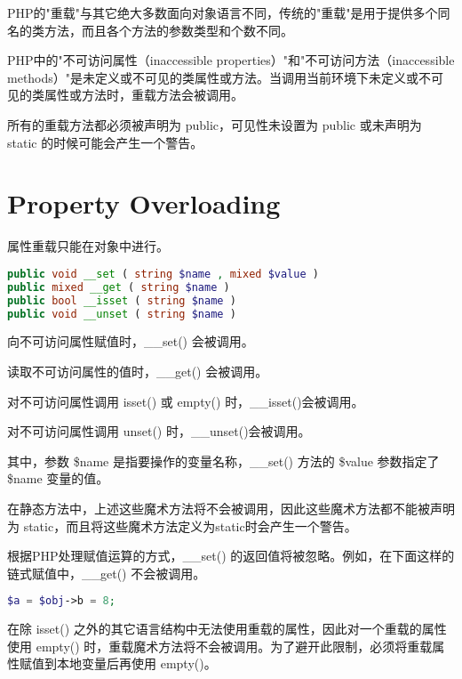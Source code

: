PHP的"重载"与其它绝大多数面向对象语言不同，传统的"重载"是用于提供多个同名的类方法，而且各个方法的参数类型和个数不同。



PHP中的"不可访问属性（inaccessible properties）"和"不可访问方法（inaccessible methods）"是未定义或不可见的类属性或方法。当调用当前环境下未定义或不可见的类属性或方法时，重载方法会被调用。

所有的重载方法都必须被声明为 public，可见性未设置为 public 或未声明为 static 的时候可能会产生一个警告。

\section{Property Overloading}


属性重载只能在对象中进行。

\begin{lstlisting}[language=PHP]
public void __set ( string $name , mixed $value )
public mixed __get ( string $name )
public bool __isset ( string $name )
public void __unset ( string $name )
\end{lstlisting}

\begin{compactitem}
\item 向不可访问属性赋值时，\_\_set() 会被调用。
\item 读取不可访问属性的值时，\_\_get() 会被调用。
\item 对不可访问属性调用 isset() 或 empty() 时，\_\_isset()会被调用。
\item 对不可访问属性调用 unset() 时，\_\_unset()会被调用。
\end{compactitem}

其中，参数 \$name 是指要操作的变量名称，\_\_set() 方法的 \$value 参数指定了 \$name 变量的值。


在静态方法中，上述这些魔术方法将不会被调用，因此这些魔术方法都不能被声明为 static，而且将这些魔术方法定义为static时会产生一个警告。

根据PHP处理赋值运算的方式，\_\_set() 的返回值将被忽略。例如，在下面这样的链式赋值中，\_\_get() 不会被调用。

\begin{lstlisting}[language=PHP]
$a = $obj->b = 8;
\end{lstlisting}


在除 isset() 之外的其它语言结构中无法使用重载的属性，因此对一个重载的属性使用 empty() 时，重载魔术方法将不会被调用。为了避开此限制，必须将重载属性赋值到本地变量后再使用 empty()。

